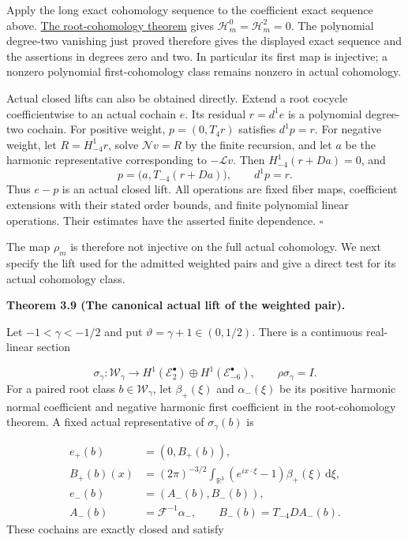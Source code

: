 \documentclass[
  english,
  11pt,
  reqno]{amsart}
\makeatletter
\newcommand{\pandocstatementheading}[1]{%
  \par\addpenalty{\@beginparpenalty}%
  \addvspace{.5\baselineskip plus .2\baselineskip minus .2\baselineskip}%
  {\normalfont\bfseries #1\par}%
  \nobreak\@afterindenttrue\@afterheading
}
\makeatother
\begin{document}
Apply the long exact cohomology sequence to the coefficient exact
sequence above. \hyperref[thm:online-moderate-root-cohomology]{The
root-cohomology theorem} gives \(\mathscr H_m^0=\mathscr H_m^2=0\). The
polynomial degree-two vanishing just proved therefore gives the
displayed exact sequence and the assertions in degrees zero and two. In
particular its first map is injective; a nonzero polynomial
first-cohomology class remains nonzero in actual cohomology.

Actual closed lifts can also be obtained directly. Extend a root cocycle
coefficientwise to an actual cochain \(e\). Its residual \(r=d^1e\) is a
polynomial degree-two cochain. For positive weight, \(p=(0,T_4r)\)
satisfies \(d^1p=r\). For negative weight, let \(R=H_{-4}^1r\), solve
\(\mathcal Nv=R\) by the finite recursion, and let \(a\) be the harmonic
representative corresponding to \(-\mathcal Lv\). Then
\(H_{-4}^1(r+Da)=0\), and \[
p=\bigl(a,T_{-4}(r+Da)\bigr),\qquad d^1p=r.
\] Thus \(e-p\) is an actual closed lift. All operations are fixed fiber
maps, coefficient extensions with their stated order bounds, and finite
polynomial linear operations. Their estimates have the asserted finite
dependence. \hfill\(\square\)

The map \(\rho_m\) is therefore not injective on the full actual
cohomology. We next specify the lift used for the admitted weighted
pairs and give a direct test for its actual cohomology class.

\pandocstatementheading{\leavevmode{}\label{thm:online-canonical-actual-pair-lift}Theorem 3.9 (The canonical actual lift of the weighted pair).}

Let \(-1<\gamma<-1/2\) and put \(\vartheta=\gamma+1\in(0,1/2)\). There
is a continuous real-linear section

\label{eq:online-canonical-ordinary-section} \[
\sigma_\gamma:\mathscr W_\gamma
\longrightarrow
H^1(\mathscr E_2^\bullet)\oplus
H^1(\mathscr E_{-6}^\bullet),
\qquad \rho\sigma_\gamma=I.
\] For a paired root class \(b\in\mathscr W_\gamma\), let
\(\beta_+(\xi)\) and \(\alpha_-(\xi)\) be its positive harmonic normal
coefficient and negative harmonic first coefficient in the
root-cohomology theorem. A fixed actual representative of
\(\sigma_\gamma(b)\) is

\label{eq:online-canonical-actual-representatives} \[
\begin{aligned}
e_+(b)&=(0,B_+(b)),\\
B_+(b)(x)&=(2\pi)^{-3/2}\int_{
\mathbb R^3}(e^{ix\cdot\xi}-1)\beta_+(\xi)\,\mathrm d\xi,\\
e_-(b)&=(A_-(b),B_-(b)),\\
A_-(b)&=\mathcal F^{-1}\alpha_-,
\qquad B_-(b)=T_{-4}D A_-(b).
\end{aligned}
\] These cochains are exactly closed and satisfy
\end{document}
